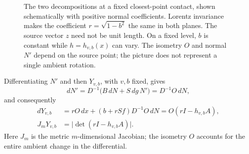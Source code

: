 \begin{figure}[ht]
\centering
{}
\caption{The two decompositions at a fixed closest-point contact, shown
schematically with positive normal coefficients. Lorentz invariance
makes the coefficient $r=\sqrt{1-b^2}$ the same in both planes.
The source vector $z$ need not be unit length. On a fixed level, $b$
is constant while $h=h_{v,b}(x)$ can vary. The isometry $O$ and normal
$N'$ depend on the source point; the picture does not represent a
single ambient rotation.}
\label{fig:family-normal-planes}
\end{figure}

Differentiating $N'$ and then $Y_{v,b}$, with $v,b$ fixed, gives
\[
 dN'=D^{-1}\bigl(B\,dN+S\,dg\,N'\bigr)=D^{-1}O\,dN,
\]
and consequently
\begin{equation}\label{eq:family-jacobian}
 \begin{split}
 dY_{v,b}
 &=rO\,dx+(b+rSf)D^{-1}O\,dN
   =O(rI-h_{v,b}A),\\
 J_mY_{v,b}&=\bigl|\det(rI-h_{v,b}A)\bigr|.
 \end{split}
\end{equation}
Here $J_m$ is the metric $m$-dimensional Jacobian; the isometry $O$
accounts for the entire ambient change in the differential.

